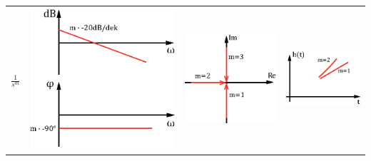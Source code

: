 \begin{tabular}{>{\centering\arraybackslash}p{1.5cm}|>{\centering\arraybackslash}p{2.5cm}|>{\centering\arraybackslash}p{2cm}|>{\centering\arraybackslash}p{2.5cm}}
\hline \rule[-2ex]{0pt}{5.5ex} $\frac{1}{s^m}$ & \includegraphics[scale = 0.3]{../fig/bode_sm.eps}  & \includegraphics[scale = 0.4]{../fig/ort_sm.eps}  & \includegraphics[scale = 0.5]{../fig/spr_sm.eps} \\ 

\end{tabular}
